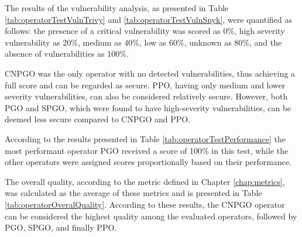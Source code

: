 The results of the vulnerability analysis, as presented in Table \ref{tab:operatorTestVulnTrivy} and \ref{tab:operatorTestVulnSnyk}, were quantified as follows: the presence of a critical vulnerability was scored as 0\%, high severity vulnerability as 20\%, medium as 40\%, low as 60\%, unknown as 80\%, and the absence of vulnerabilities as 100\%.

CNPGO was the only operator with no detected vulnerabilities, thus achieving a full score and can be regarded as secure. PPO, having only medium and lower severity vulnerabilities, can also be considered relatively secure. However, both PGO and SPGO, which were found to have high-severity vulnerabilities, can be deemed less secure compared to CNPGO and PPO.

According to the results presented in Table \ref{tab:operatorTestPerformance} the most performant operator PGO received a score of 100\% in this test, while the other operators were assigned scores proportionally based on their performance.



The overall quality, according to the metric defined in Chapter \ref{chap:metrics}, was calculated as the average of these metrics and is presented in Table \ref{tab:operatorOveralQuality}.
According to these results, the CNPGO operator can be considered the highest quality among the evaluated operators, followed by PGO, SPGO, and finally PPO.




